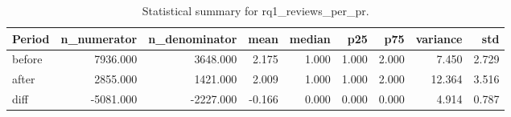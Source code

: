 \begin{table}[h]
\centering
\begin{tabular}{lrrrrrrrr}
\toprule
Period & n_numerator & n_denominator & mean & median & p25 & p75 & variance & std \\
\midrule
before & 7936.000 & 3648.000 & 2.175 & 1.000 & 1.000 & 2.000 & 7.450 & 2.729 \\
after & 2855.000 & 1421.000 & 2.009 & 1.000 & 1.000 & 2.000 & 12.364 & 3.516 \\
diff & -5081.000 & -2227.000 & -0.166 & 0.000 & 0.000 & 0.000 & 4.914 & 0.787 \\
\bottomrule
\end{tabular}
\caption{Statistical summary for rq1_reviews_per_pr.}\label{tab:rq1_reviews_per_pr}
\end{table}
